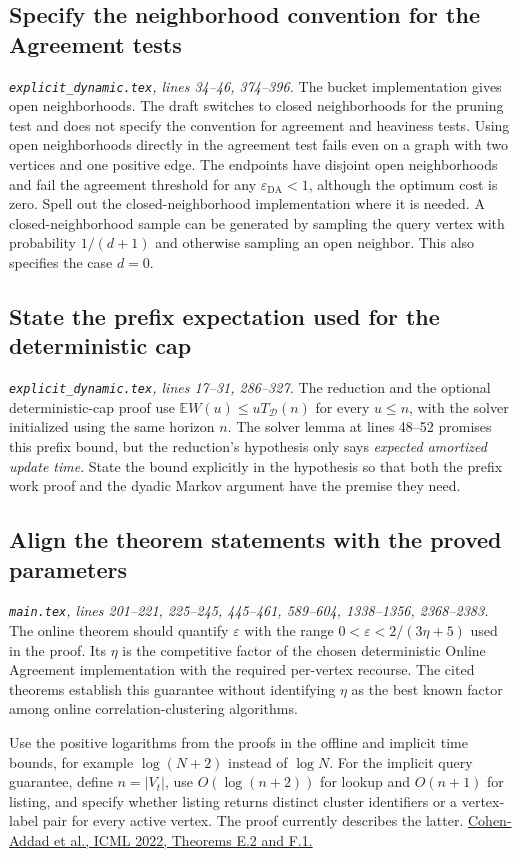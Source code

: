 \documentclass[11pt]{article}
\newcommand{\loc}[2]{\textit{#1, lines #2.}}
\newcommand{\mt}[1]{\loc{\texttt{main.tex}}{#1}}
\newcommand{\ed}[1]{\loc{\texttt{explicit\_dynamic.tex}}{#1}}
\begin{document}
\subsection{Specify the neighborhood convention for the Agreement tests}

\ed{34--46, 374--396}
The bucket implementation gives open neighborhoods. The draft switches
to closed neighborhoods for the pruning test and does not specify the
convention for agreement and heaviness tests. Using open neighborhoods
directly in the agreement test fails even on a graph with two vertices
and one positive edge. The endpoints have disjoint open neighborhoods
and fail the agreement threshold for any \(\varepsilon_{\mathrm{DA}}<1\),
although the optimum cost is zero. Spell out the closed-neighborhood
implementation where it is needed. A closed-neighborhood sample can be
generated by sampling the query vertex with probability \(1/(d+1)\)
and otherwise sampling an open neighbor. This also specifies the case
\(d=0\).

\subsection{State the prefix expectation used for the deterministic cap}

\ed{17--31, 286--327}
The reduction and the optional deterministic-cap proof use
\(\mathbb E W(u)\le uT_{\mathcal D}(n)\) for every \(u\le n\), with
the solver initialized using the same horizon \(n\). The solver lemma at
lines 48--52 promises this prefix bound, but the reduction's hypothesis
only says \emph{expected amortized update time}. State the bound explicitly
in the hypothesis so that both the prefix work proof and the dyadic
Markov argument have the premise they need.

\subsection{Align the theorem statements with the proved parameters}

\mt{201--221, 225--245, 445--461, 589--604, 1338--1356, 2368--2383}
The online theorem should quantify \(\varepsilon\) with the range
\(0<\varepsilon<2/(3\eta+5)\) used in the proof. Its \(\eta\) is the
competitive factor of the chosen deterministic Online Agreement
implementation with the required per-vertex recourse. The cited
theorems establish this guarantee without identifying \(\eta\) as the
best known factor among online correlation-clustering algorithms.

Use the positive logarithms from the proofs in the offline and
implicit time bounds, for example \(\log(N+2)\) instead of \(\log N\).
For the implicit query guarantee, define \(n=|V_t|\), use
\(O(\log(n+2))\) for lookup and \(O(n+1)\) for listing, and specify
whether listing returns distinct cluster identifiers or a vertex-label
pair for every active vertex. The proof currently describes the latter.
\href{https://proceedings.mlr.press/v162/cohen-addad22a.html}{Cohen-Addad et al.,
ICML 2022, Theorems E.2 and F.1.}
\end{document}
